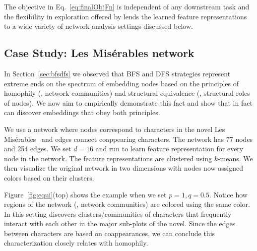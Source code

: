 
The objective in Eq.~\ref{eq:finalObjFn} is independent of any downstream task and the flexibility in exploration offered by \nodevec lends the learned feature representations to a wide variety of network analysis settings discussed below.

\subsection{Case Study: Les Mis\'{e}rables network}

In Section~\ref{sec:bfsdfs} we observed that BFS and DFS strategies represent extreme ends on the spectrum of embedding nodes based on the principles of homophily (\ie, network communities) and structural equivalence (\ie, structural roles of nodes). We now aim to empirically demonstrate this fact and show that \nodevec in fact can discover embeddings that obey both principles.

We use a network where nodes correspond to characters in the novel Les Mis\'{e}rables~\cite{knuth-1993} and edges connect coappearing characters. The network has 77 nodes and 254 edges. We set $d=16$ and run \nodevec to learn feature representation for every node in the network. The feature representations are clustered using $k$-means. We then visualize the original network in two dimensions with nodes now assigned colors based on their clusters.


Figure~\ref{fig:equi}(top) shows the example when we set $p=1, q=0.5$. Notice how regions of the network (\ie, network communities) are colored using the same color. In this setting \nodevec discovers clusters/communities of characters that frequently interact with each other in the major sub-plots of the novel. Since the edges between characters are based on coappearances, we can conclude this characterization closely relates with homophily. 

